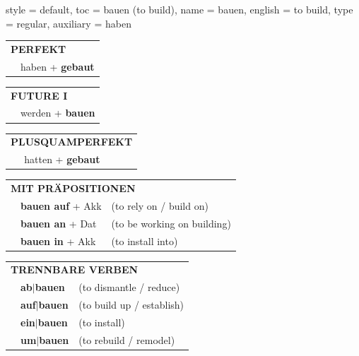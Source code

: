 \begin{verbentry}{
  style = {default},
  toc = {bauen (to build)},
  name = {bauen},
  english = {to build},
  type = {regular},
  auxiliary = {haben}
}
    \vspace{10pt}

 \begin{tabular}{rl}
     \multicolumn{2}{l}{\textbf{PERFEKT}}\\
   & haben + \textbf{gebaut}\\
  \end{tabular}
\hfill
   \begin{tabular}{rl}
   
    \multicolumn{2}{l}{\textbf{FUTURE I} }\\
   & werden + \textbf{bauen}\\
 
  \end{tabular}
\hfill
   \begin{tabular}{rl}
      \multicolumn{2}{l}{\textbf{PLUSQUAMPERFEKT}}\\
   & hatten + \textbf{gebaut}\\
  \end{tabular}

   \vspace{10pt}

   \begin{tabular}{lll}
      \multicolumn{3}{l}{\textbf{MIT PRÄPOSITIONEN}}\\
& \textbf{bauen auf} + Akk & (to rely on / build on)\\
& \textbf{bauen an} + Dat & (to be working on building)\\
& \textbf{bauen in} + Akk & (to install into)\\
   \end{tabular}
  \hfill
   \begin{tabular}{lll}
      \multicolumn{3}{l}{\textbf{TRENNBARE VERBEN}}\\
 & \textbf{ab$|$bauen} & (to dismantle / reduce)\\
 & \textbf{auf$|$bauen} & (to build up / establish)\\
 & \textbf{ein$|$bauen} & (to install)\\
 & \textbf{um$|$bauen} & (to rebuild / remodel)
  \end{tabular}

\vspace{-5pt}
\end{verbentry}

